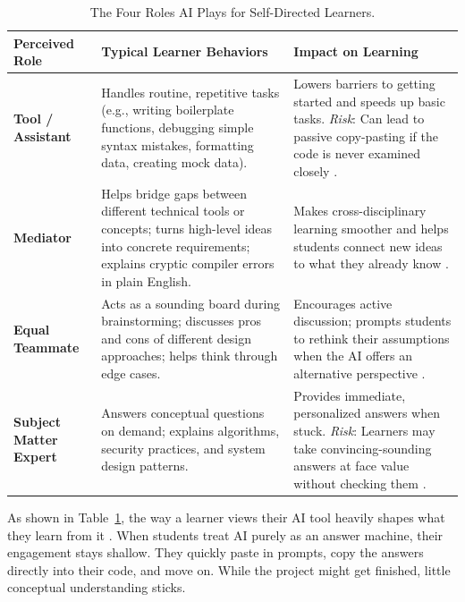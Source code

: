 \documentclass[11pt]{article}
\begin{document}
\begin{table}[htbp]
\centering
\small
\caption{The Four Roles AI Plays for Self-Directed Learners.}
\label{tab:ai_roles}
\begin{tabularx}{\linewidth}{p{2.5cm} >{\raggedright\arraybackslash}X >{\raggedright\arraybackslash}p{4.6cm}}
\toprule
\textbf{Perceived Role} & \textbf{Typical Learner Behaviors} & \textbf{Impact on Learning} \\
\midrule
\textbf{Tool / Assistant} & 
Handles routine, repetitive tasks (e.g., writing boilerplate functions, debugging simple syntax mistakes, formatting data, creating mock data). & 
Lowers barriers to getting started and speeds up basic tasks. \textit{Risk}: Can lead to passive copy-pasting if the code is never examined closely \citep{zheng2024}. \\
\addlinespace
\textbf{Mediator} & 
Helps bridge gaps between different technical tools or concepts; turns high-level ideas into concrete requirements; explains cryptic compiler errors in plain English. & 
Makes cross-disciplinary learning smoother and helps students connect new ideas to what they already know \citep{zheng2024}. \\
\addlinespace
\textbf{Equal Teammate} & 
Acts as a sounding board during brainstorming; discusses pros and cons of different design approaches; helps think through edge cases. & 
Encourages active discussion; prompts students to rethink their assumptions when the AI offers an alternative perspective \citep{song2026heutagogy}. \\
\addlinespace
\textbf{Subject Matter Expert} & 
Answers conceptual questions on demand; explains algorithms, security practices, and system design patterns. & 
Provides immediate, personalized answers when stuck. \textit{Risk}: Learners may take convincing-sounding answers at face value without checking them \citep{song2026heutagogy}. \\
\bottomrule
\end{tabularx}
\end{table}

As shown in Table~\ref{tab:ai_roles}, the way a learner views their AI tool heavily shapes what they learn from it \citep{zheng2024}. When students treat AI purely as an answer machine, their engagement stays shallow. They quickly paste in prompts, copy the answers directly into their code, and move on. While the project might get finished, little conceptual understanding sticks.
\end{document}
